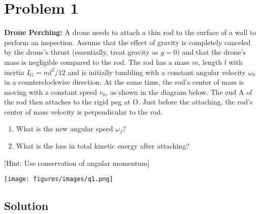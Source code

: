 \section*{Problem 1}

\textbf{Drone Perching:}
A drone needs to attach a thin rod to the surface of a wall to perform an inspection.
Assume that the effect of gravity is completely canceled by the drone's thrust (essentially, treat gravity as \(g = 0\)) and that the drone's mass is negligible compared to the rod.
The rod has a mass \(m\), length \(l\) with inertia \(I_G = ml^2/12\) and is initially tumbling with a constant angular velocity \(\omega_0\) in a counterclockwise direction.
At the same time, the rod's center of mass is moving with a constant speed \(v_0\), as shown in the diagram below.
The end A of the rod then attaches to the rigid peg at O.
Just before the attaching, the rod's center of mass velocity is perpendicular to the rod.
\begin{enumerate}[label= (\alph*)]
    \item What is the new angular speed \(\omega_f\)?
    \item What is the loss in total kinetic energy after attaching?
\end{enumerate}
[Hint: Use conservation of angular momentum]

\begin{figure*}[h]
    \centering
    \texttt{[image: figures/images/q1.png]}
\end{figure*}

\subsection*{Solution}

